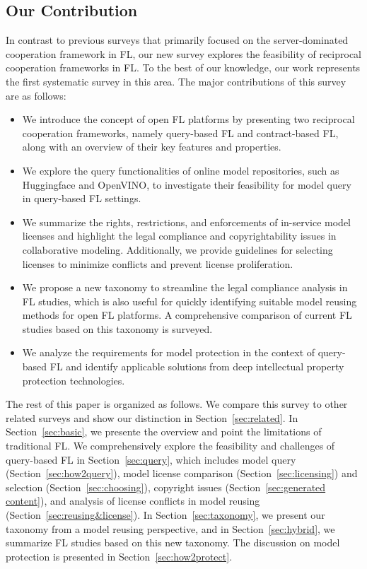 \subsection{Our Contribution}
  In contrast to previous surveys that primarily focused on the server-dominated cooperation framework in FL,  our new survey explores the feasibility of reciprocal cooperation frameworks in FL.
  To the best of our knowledge, our work represents the first systematic survey in this area.
  The major contributions of this survey are as follows:
  \begin{itemize}
      \item We introduce the concept of open FL platforms by presenting two reciprocal cooperation frameworks, namely query-based FL and contract-based FL, along with an overview of their key features and properties.
      \item We explore the query functionalities of online model repositories, such as Huggingface and OpenVINO, to investigate their feasibility for model query in query-based FL settings.
      \item We summarize the rights, restrictions, and enforcements of in-service model licenses and highlight the legal compliance and copyrightability issues in collaborative modeling. Additionally, we provide guidelines for selecting licenses to minimize conflicts and prevent license proliferation.
      \item We propose a new taxonomy to streamline the legal compliance analysis in FL studies, which is also useful for quickly identifying suitable model reusing methods for open FL platforms. A comprehensive comparison of current FL studies based on this taxonomy is surveyed.
      \item We analyze the requirements for model protection in the context of query-based FL and identify applicable solutions from deep intellectual property protection technologies.
\end{itemize}
  
The rest of this paper is organized as follows. 
We compare this survey to other related surveys and show our distinction in Section~\ref{sec:related}. 
In Section~\ref{sec:basic}, we presente the overview and point the limitations of traditional FL.
We comprehensively explore the feasibility and challenges of query-based FL in Section~\ref{sec:query}, which includes model query (Section~\ref{sec:how2query}), model license comparison (Section~\ref{sec:licensing}) and selection (Section~\ref{sec:choosing}), copyright issues (Section~\ref{sec:generated content}), and analysis of license conflicts in model reusing (Section~\ref{sec:reusing&license}).
In Section~\ref{sec:taxonomy}, we present our taxonomy from a model reusing perspective, and in Section~\ref{sec:hybrid}, we summarize FL studies based on this new taxonomy.
The discussion on model protection is presented in Section~\ref{sec:how2protect}.


